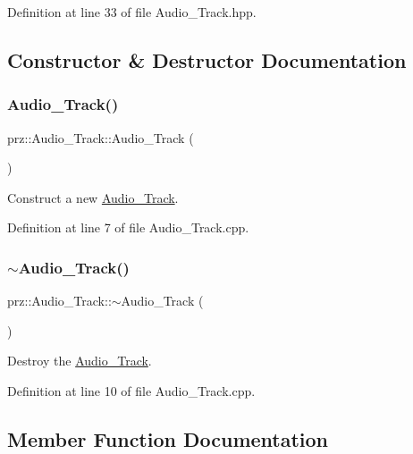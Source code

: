 Definition at line 33 of file Audio\+\_\+\+Track.\+hpp.



\subsection{Constructor \& Destructor Documentation}
\mbox{\label{classprz_1_1_audio___track_ad37bc5741cd0823f8f9277d00a81f50f}} 
\subsubsection{\texorpdfstring{Audio\_Track()}{Audio\_Track()}}
{\footnotesize\ttfamily prz\+::\+Audio\+\_\+\+Track\+::\+Audio\+\_\+\+Track (\begin{DoxyParamCaption}{ }\end{DoxyParamCaption})}



Construct a new \mbox{\hyperlink{classprz_1_1_audio___track}{Audio\+\_\+\+Track}}. 



Definition at line 7 of file Audio\+\_\+\+Track.\+cpp.

\mbox{\label{classprz_1_1_audio___track_a32d24bf61b957d9d5e483eb4c4fbf5c2}} 
\subsubsection{\texorpdfstring{$\sim$Audio\_Track()}{~Audio\_Track()}}
{\footnotesize\ttfamily prz\+::\+Audio\+\_\+\+Track\+::$\sim$\+Audio\+\_\+\+Track (\begin{DoxyParamCaption}{ }\end{DoxyParamCaption})}



Destroy the \mbox{\hyperlink{classprz_1_1_audio___track}{Audio\+\_\+\+Track}}. 



Definition at line 10 of file Audio\+\_\+\+Track.\+cpp.



\subsection{Member Function Documentation}
\mbox{\label{classprz_1_1_audio___track_a6487c33aca7d2d496ca39037f5f75170}} 
